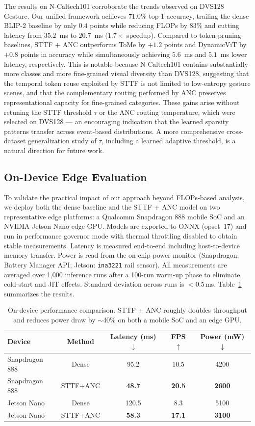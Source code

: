 \documentclass{article}
\begin{document}
The results on N-Caltech101 corroborate the trends observed on DVS128 Gesture. Our unified framework achieves $71.0\%$ top-1 accuracy, trailing the dense BLIP-2 baseline by only $0.4$ points while reducing FLOPs by $83\%$ and cutting latency from $35.2$~ms to $20.7$~ms ($1.7\times$ speedup). Compared to token-pruning baselines, STTF + ANC outperforms ToMe by $+1.2$ points and DynamicViT by $+0.8$ points in accuracy while simultaneously achieving $5.6$~ms and $5.1$~ms lower latency, respectively. This is notable because N-Caltech101 contains substantially more classes and more fine-grained visual diversity than DVS128, suggesting that the temporal token reuse exploited by STTF is not limited to low-entropy gesture scenes, and that the complementary routing performed by ANC preserves representational capacity for fine-grained categories. These gains arise without retuning the STTF threshold $\tau$ or the ANC routing temperature, which were selected on DVS128 --- an encouraging indication that the learned sparsity patterns transfer across event-based distributions. A more comprehensive cross-dataset generalization study of $\tau$, including a learned adaptive threshold, is a natural direction for future work.

\subsection{On-Device Edge Evaluation}

To validate the practical impact of our approach beyond FLOPs-based analysis, we deploy both the dense baseline and the STTF + ANC model on two representative edge platforms: a Qualcomm Snapdragon 888 mobile SoC and an NVIDIA Jetson Nano edge GPU. Models are exported to ONNX (opset~17) and run in performance governor mode with thermal throttling disabled to obtain stable measurements. Latency is measured end-to-end including host-to-device memory transfer. Power is read from the on-chip power monitor (Snapdragon: Battery Manager API; Jetson: \texttt{ina3221} rail sensor). All measurements are averaged over 1{,}000 inference runs after a 100-run warm-up phase to eliminate cold-start and JIT effects. Standard deviation across runs is $<$0.5\,ms. Table~\ref{tab:ondevice} summarizes the results.

\begin{table}[htbp]
\centering
\caption{On-device performance comparison. STTF + ANC roughly doubles throughput and reduces power draw by $\sim$40\% on both a mobile SoC and an edge GPU.}
\label{tab:ondevice}
\begin{tabular}{lcccc}
\toprule
Device & Method & Latency (ms) $\downarrow$ & FPS $\uparrow$ & Power (mW) $\downarrow$ \\
\midrule
Snapdragon 888 & Dense & 95.2 & 10.5 & 4200 \\
Snapdragon 888 & STTF+ANC & \textbf{48.7} & \textbf{20.5} & \textbf{2600} \\
\midrule
Jetson Nano & Dense & 120.5 & 8.3 & 5100 \\
Jetson Nano & STTF+ANC & \textbf{58.3} & \textbf{17.1} & \textbf{3100} \\
\bottomrule
\end{tabular}
\end{table}
\end{document}
